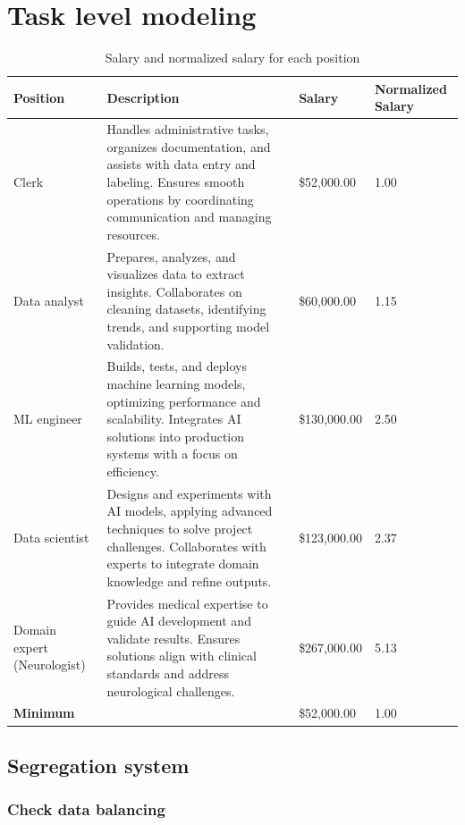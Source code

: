 \section{Task level modeling}

\begin{table}[H]
\centering
\begin{tabularx}{\textwidth}{|p{2.3cm}|X|l|m{2.2cm}|}
\hline
\textbf{Position} & \textbf{Description} & \textbf{Salary} & \textbf{Normalized Salary} \\
\hline
Clerk & Handles administrative tasks, organizes documentation, and assists with data entry and labeling.
Ensures smooth operations by coordinating communication and managing resources. & \$52,000.00 & 1.00 \\
\hline
Data analyst & Prepares, analyzes, and visualizes data to extract insights. 
Collaborates on cleaning datasets, identifying trends, and supporting model validation. & \$60,000.00 & 1.15 \\
\hline
ML engineer & Builds, tests, and deploys machine learning models, optimizing performance and scalability. 
Integrates AI solutions into production systems with a focus on efficiency. & \$130,000.00 & 2.50 \\
\hline
Data scientist & Designs and experiments with AI models, applying advanced techniques to solve project challenges. 
Collaborates with experts to integrate domain knowledge and refine outputs. & \$123,000.00 & 2.37 \\
\hline
Domain expert (Neurologist) & Provides medical expertise to guide AI development and validate results. 
Ensures solutions align with clinical standards and address neurological challenges. & \$267,000.00 & 5.13 \\
\hline
\multicolumn{2}{|l|}{\textbf{Minimum}} & \$52,000.00 & 1.00 \\
\hline
\end{tabularx}
\caption{Salary and normalized salary for each position}
\label{table:salary}
\end{table}

\subsection{Segregation system}

\subsubsection{Check data balancing}

